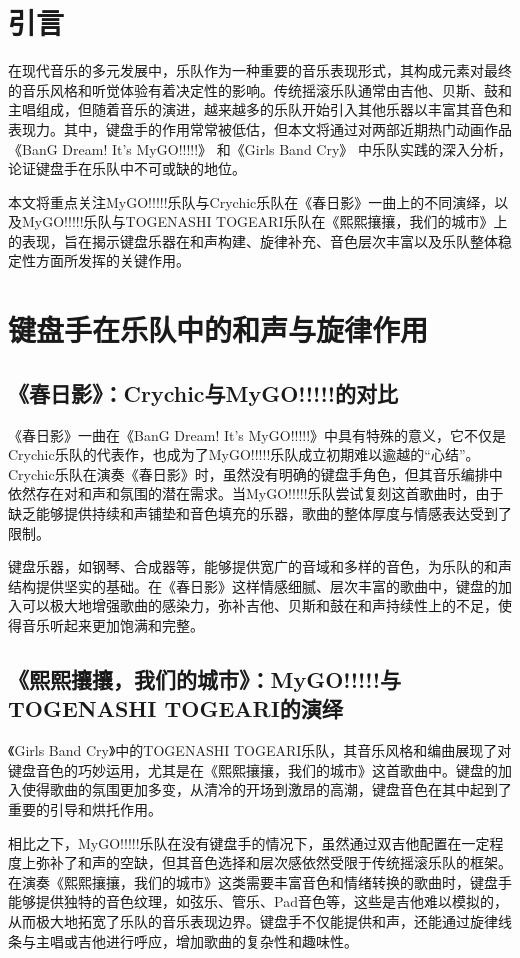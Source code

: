 \documentclass{pkuthesis}
\begin{document}
\section{引言}
在现代音乐的多元发展中，乐队作为一种重要的音乐表现形式，其构成元素对最终的音乐风格和听觉体验有着决定性的影响。传统摇滚乐队通常由吉他、贝斯、鼓和主唱组成，但随着音乐的演进，越来越多的乐队开始引入其他乐器以丰富其音色和表现力。其中，键盘手的作用常常被低估，但本文将通过对两部近期热门动画作品《BanG Dream! It's MyGO!!!!!》\cite{bangdream_mygo} 和《Girls Band Cry》\cite{girls_band_cry} 中乐队实践的深入分析，论证键盘手在乐队中不可或缺的地位。

本文将重点关注MyGO!!!!!乐队与Crychic乐队在《春日影》一曲上的不同演绎，以及MyGO!!!!!乐队与TOGENASHI TOGEARI乐队在《熙熙攘攘，我们的城市》上的表现，旨在揭示键盘乐器在和声构建、旋律补充、音色层次丰富以及乐队整体稳定性方面所发挥的关键作用。

\section{键盘手在乐队中的和声与旋律作用}

\subsection{《春日影》：Crychic与MyGO!!!!!的对比}
《春日影》一曲在《BanG Dream! It's MyGO!!!!!》中具有特殊的意义，它不仅是Crychic乐队的代表作，也成为了MyGO!!!!!乐队成立初期难以逾越的“心结”。Crychic乐队在演奏《春日影》时，虽然没有明确的键盘手角色，但其音乐编排中依然存在对和声和氛围的潜在需求。当MyGO!!!!!乐队尝试复刻这首歌曲时，由于缺乏能够提供持续和声铺垫和音色填充的乐器，歌曲的整体厚度与情感表达受到了限制。

键盘乐器，如钢琴、合成器等，能够提供宽广的音域和多样的音色，为乐队的和声结构提供坚实的基础。在《春日影》这样情感细腻、层次丰富的歌曲中，键盘的加入可以极大地增强歌曲的感染力，弥补吉他、贝斯和鼓在和声持续性上的不足，使得音乐听起来更加饱满和完整。

\subsection{《熙熙攘攘，我们的城市》：MyGO!!!!!与TOGENASHI TOGEARI的演绎}
《Girls Band Cry》中的TOGENASHI TOGEARI乐队，其音乐风格和编曲展现了对键盘音色的巧妙运用，尤其是在《熙熙攘攘，我们的城市》这首歌曲中。键盘的加入使得歌曲的氛围更加多变，从清冷的开场到激昂的高潮，键盘音色在其中起到了重要的引导和烘托作用。

相比之下，MyGO!!!!!乐队在没有键盘手的情况下，虽然通过双吉他配置在一定程度上弥补了和声的空缺，但其音色选择和层次感依然受限于传统摇滚乐队的框架。在演奏《熙熙攘攘，我们的城市》这类需要丰富音色和情绪转换的歌曲时，键盘手能够提供独特的音色纹理，如弦乐、管乐、Pad音色等，这些是吉他难以模拟的，从而极大地拓宽了乐队的音乐表现边界。键盘手不仅能提供和声，还能通过旋律线条与主唱或吉他进行呼应，增加歌曲的复杂性和趣味性。
\end{document}
